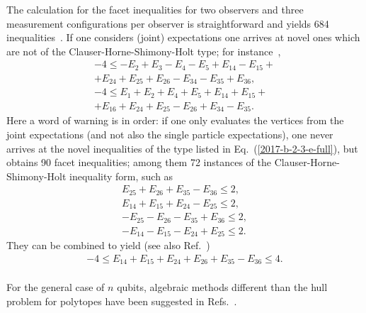 \documentclass[%
  twocolumn,
 showpacs,
 showkeys,
 preprintnumbers,
 amsmath,amssymb,
 aps,
  pra,
  longbibliography,
 floatfix,
 ]{revtex4-1}
\begin{document}
The calculation for the facet inequalities for two observers and three measurement configurations per observer is straightforward
and yields  684 inequalities~\cite{2000-poly,sliwa-2003,collins-gisin-2003}.
If one considers (joint) expectations one arrives at novel ones
which are not of the Clauser-Horne-Shimony-Holt type; for instance~\cite[p.~166, Eq.~(4)]{sliwa-2003},
\begin{equation}
\begin{split}
-4   \le    -E_2  +E_3 -E_4  -E_5  +E_{14} -E_{15} +    \\+E_{24}  +E_{25}  +E_{26} -E_{34} -E_{35}  +E_{36},     \\
-4 \le   E_1  +E_2   +E_4  +E_5    +E_{14}  +E_{15} + \\+E_{16}  +E_{24}  +E_{25} -E_{26}  +E_{34} -E_{35}.
\end{split}
\label{2017-b-2-3-e-full}
\end{equation}
Here a word of warning is in order: if one only evaluates the vertices from the joint expectations (and not also the single particle expectations),
one never arrives at the novel inequalities of the type listed in Eq.~(\ref{2017-b-2-3-e-full}),
but obtains
90 facet inequalities; among them 72
instances  of the Clauser-Horne-Shimony-Holt inequality form, such as
\begin{equation}
\begin{split}
   E_{25} +E_{26}    +E_{35}  -E_{36}  \le   2,            \\
 E_{14} +E_{15}    +E_{24}  -E_{25}          \le      2,      \\
  -E_{25} -E_{26}    -E_{35}  +E_{36}  \le   2,           \\
 -E_{14} -E_{15}    -E_{24}  +E_{25}          \le      2.
\end{split}
\label{2017-b-2-3-e}
\end{equation}
They can be combined to yield  (see also Ref.~\cite[p.~166, Eq.~(4)]{sliwa-2003})
\begin{equation}
\begin{split}
-4 \le   E_{14} + E_{15}    + E_{24}   + E_{26}    + E_{35}  - E_{36}  \le   4.            \\
\end{split}
\label{2017-b-2-3-enovel}
\end{equation}


For the general case of $n$ qubits, algebraic methods
different than the hull problem for polytopes have been suggested in Refs.~\cite{Werner-2001,Zukowski-02,Pitowsky-2002mbo,schachner-2003}.
\end{document}
